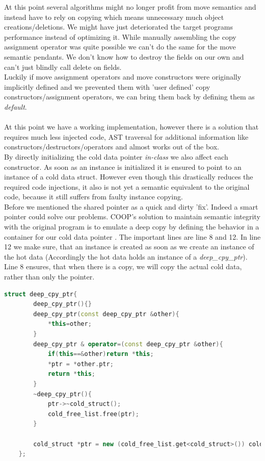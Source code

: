 At this point several algorithms might no longer profit from move semantics and instead have to rely on copying which means unnecessary much object creations/deletions. We might have just deteriorated the target programs performance instead of optimizing it. While manually assembling the copy assignment operator was quite possible we can't do the same for the move semantic pendants. We don't know how to destroy the fields on our own and can't just blindly call delete on fields.\\
Luckily if move assignment operators and move constructors were originally implicitly defined and we prevented them with 'user defined' copy constructors/assignment operators, we can bring them back by defining them as \textit{default}.\\\\
At this point we have a working implementation, however there is a solution that requires much less injected code, AST traversal for additional information like constructors/destructors/operators and almost works out of the box.\\
By directly initializing the cold data pointer \textit{in-class} we also affect each constructor. As soon as an instance is initialized it is ensured to point to an instance of a cold data struct. However even though this drastically reduces the required code injections, it also is not yet a semantic equivalent to the original code, because it still suffers from faulty instance copying.\\
Before we mentioned the shared pointer as a quick and dirty 'fix'. Indeed a smart pointer could solve our problems. COOP's solution to maintain semantic integrity with the original program is to emulate a deep copy by defining the behavior in a container for our cold data pointer . The important lines are line 8 and 12. In line 12 we make sure, that an instance is created as soon as we create an instance of the hot data (Accordingly the hot data holds an instance of a \textit{deep\_cpy\_ptr}). Line 8 ensures, that when there is a copy, we will copy the actual cold data, rather than only the pointer. 
\begin{lstlisting}[language=C++, name={Shortened version of COOP's container for the pointer to the cold data struct intance. It only defines a single field (the pointer) so no additional memory space is spend.}, label={deep_cpy_ptr}]
	struct deep_cpy_ptr{
		deep_cpy_ptr(){}
		deep_cpy_ptr(const deep_cpy_ptr &other){
			*this=other;
		}
		deep_cpy_ptr & operator=(const deep_cpy_ptr &other){
			if(this==&other)return *this;
			*ptr = *other.ptr;
			return *this;
		}
		~deep_cpy_ptr(){
			ptr->~cold_struct();
			cold_free_list.free(ptr);
		}
		
		cold_struct *ptr = new (cold_free_list.get<cold_struct>()) cold_struct();
	};
\end{lstlisting}
